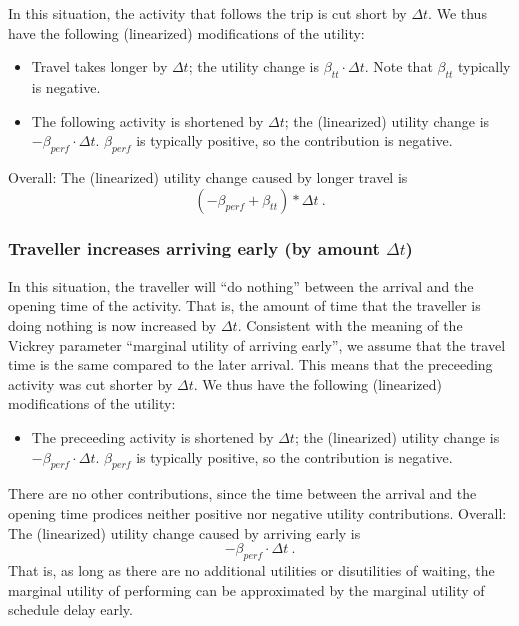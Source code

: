 In this situation, the activity that follows the trip is cut short by  $\Delta t$. We thus have the following (linearized) modifications  of the utility:
\begin{itemize}

\item Travel takes longer by $\Delta t$; the utility change is  $\beta_{tt} \cdot \Delta t$. Note that $\beta_{tt}$ typically is  negative.

\item The following activity is shortened by $\Delta t$; the (linearized)  utility change is $- \beta_{perf} \cdot \Delta t$.  $\beta_{perf}$ is  typically positive, so the contribution is negative.

\end{itemize}
Overall: The (linearized) utility change caused by longer travel is
\[
( - \beta_{perf} + \beta_{tt} ) * \Delta t \ .
\]


\subsubsection{Traveller increases arriving early (by amount $\Delta t$)}

In this situation, the traveller will ``do nothing'' between the  arrival and the opening time of the activity. That is, the amount  of time that the traveller is doing nothing is now increased by  $\Delta t$. Consistent with the meaning of the Vickrey parameter  ``marginal utility of arriving early'', we assume that the travel time is  the same compared to the later arrival. This means that the preceeding  activity was cut shorter by $\Delta t$. We thus have the following  (linearized) modifications of the utility:
\begin{itemize}

\item The preceeding activity is shortened by $\Delta t$; the
(linearized) utility change is $- \beta_{perf} \cdot \Delta t$.
	$\beta_{perf}$ is typically positive, so the contribution is
	negative.

\end{itemize}
There are no other contributions, since the time between the  arrival and the opening time prodices neither positive nor negative  utility contributions. Overall: The (linearized) utility change  caused by arriving early is
\[
- \beta_{perf} \cdot \Delta t \ .
\]
That is, as long as there are no  additional utilities or disutilities of waiting, the marginal utility of  performing can be approximated by the marginal utility of schedule  delay early.

